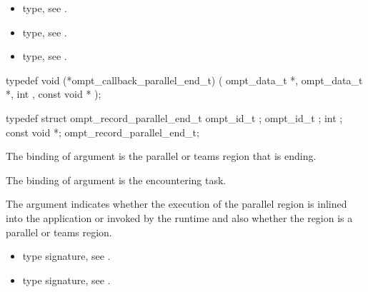 \crossreferences
\begin{itemize}
\item {} type, see .
\item {} type, see .
\item {} type, see .
\end{itemize}



\label{sec:ompt_callback_parallel_end_t}
\format

\begin{ccppspecific}
\begin{omptCallback}
typedef void (*ompt_callback_parallel_end_t) (
  ompt_data_t *,
  ompt_data_t *,
  int ,
  const void *
);
\end{omptCallback}
\end{ccppspecific}


\record

\begin{ccppspecific}
\begin{omptRecord}
typedef struct ompt_record_parallel_end_t {
  ompt_id_t ;
  ompt_id_t ;
  int ;
  const void *;
} ompt_record_parallel_end_t;
\end{omptRecord}
\end{ccppspecific}


\argdesc

The binding of argument  is the parallel or teams
region that is ending.

The binding of argument  is the encountering
task.

The argument  indicates whether the execution of the
parallel region is inlined into the application or invoked by the
runtime and also whether the region is a parallel or teams region.

\codeptrdesc

\crossreferences
\begin{itemize}
\item {} type signature, see
.
\item {} type signature, see
.
\end{itemize}

